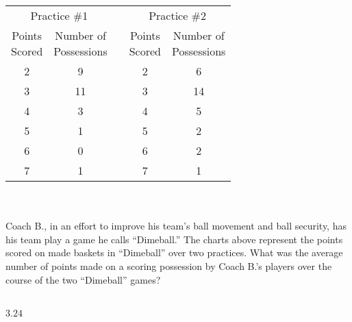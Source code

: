  
\begin{tabular}{|cc|p{1cm}|cc|}\cline{1-2}\cline{4-5}
\multicolumn{2}{|c|}{Practice \#1}& &\multicolumn{2}{|c|}{Practice \#2} \\ \cline{1-2}\cline{4-5}
\rule{0mm}{7mm}\pbox{2 in}{Points\\Scored}&\pbox{2 in}{Number of \\ Possessions} &&\pbox{2 in}{Points\\Scored}&\pbox{2 in}{Number of \\ Possessions}\\\cline{1-2}\cline{4-5}
2 & 9 && 2 & 6 \\
\rowcolor{red!40!orange!40}
3&11&\cellcolor{white}&3&14\\
4&3&&4&5\\
\rowcolor{red!40!orange!40}
5&1&\cellcolor{white}&5&2\\
6&0&&6&2\\
\rowcolor{red!40!orange!40}
7&1&\cellcolor{white}&7&1\\\cline{1-2}\cline{4-5}
\end{tabular}\\\\
Coach B., in an effort to improve his team's ball movement and ball security, has his team play a game he calls ``Dimeball.''  The charts above represent the points scored on made baskets in ``Dimeball'' over two practices.  What was the average number of points made on a scoring possession by Coach B.'s players over the course of the two ``Dimeball'' games?\\\\


\ifsat
	\begin{enumerate}[label=\Alph*)]
	\end{enumerate}
\else
\fi

\ifacteven
	\begin{enumerate}[label=\textbf{\Alph*.},itemsep=\fill,align=left]
	\end{enumerate}
\else
\fi

\ifactodd
	\begin{enumerate}[label=\textbf{\Alph*.},itemsep=\fill,align=left]
	\end{enumerate}
\else
\fi

\ifgridin
$3.24 $
\else
\fi


